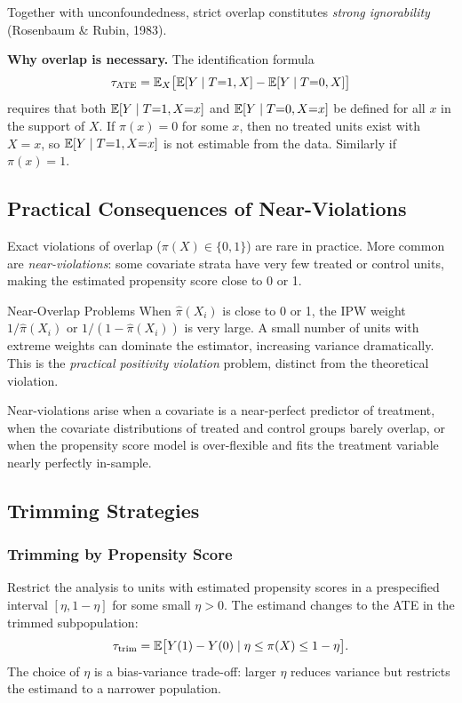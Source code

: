 \documentclass[master.tex]{subfiles}
\begin{document}
\noindent Together with unconfoundedness, strict overlap constitutes
\emph{strong ignorability} (Rosenbaum \& Rubin, 1983).

\medskip\noindent\textbf{Why overlap is necessary.}  The identification
formula
\[
  \tau_{\mathrm{ATE}}
  = \mathbb{E}_X\bigl[\mathbb{E}[Y \mid T{=}1, X] - \mathbb{E}[Y \mid T{=}0, X]\bigr]
\]
requires that both $\mathbb{E}[Y \mid T{=}1, X{=}x]$ and
$\mathbb{E}[Y \mid T{=}0, X{=}x]$ be defined for all $x$ in the support of $X$.
If $\pi(x) = 0$ for some $x$, then no treated units exist with $X = x$,
so $\mathbb{E}[Y \mid T{=}1, X{=}x]$ is not estimable from the data.
Similarly if $\pi(x) = 1$.

\subsection{Practical Consequences of Near-Violations}

Exact violations of overlap ($\pi(X) \in \{0,1\}$) are rare in practice.
More common are \emph{near-violations}: some covariate strata have very
few treated or control units, making the estimated propensity score
close to 0 or 1.

\begin{warn}{Near-Overlap Problems}
When $\hat\pi(X_i)$ is close to 0 or 1, the IPW weight
$1/\hat\pi(X_i)$ or $1/(1 - \hat\pi(X_i))$ is very large.  A small
number of units with extreme weights can dominate the estimator,
increasing variance dramatically.  This is the \emph{practical
positivity violation} problem, distinct from the theoretical violation.
\end{warn}

Near-violations arise when a covariate is a near-perfect predictor of
treatment, when the covariate distributions of treated and control
groups barely overlap, or when the propensity score model is
over-flexible and fits the treatment variable nearly perfectly in-sample.

\subsection{Trimming Strategies}

\subsubsection*{Trimming by Propensity Score}
Restrict the analysis to units with estimated propensity scores in a
prespecified interval $[\eta, 1-\eta]$ for some small $\eta > 0$.
The estimand changes to the ATE in the trimmed subpopulation:
\[
  \tau_{\mathrm{trim}}
  = \mathbb{E}\bigl[Y(1) - Y(0) \mid \eta \le \pi(X) \le 1-\eta\bigr].
\]
The choice of $\eta$ is a bias-variance trade-off: larger $\eta$ reduces
variance but restricts the estimand to a narrower population.
\end{document}
